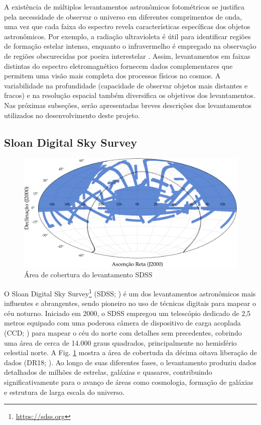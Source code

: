 A existência de múltiplos levantamentos astronômicos fotométricos se justifica pela necessidade de observar o universo em diferentes comprimentos de onda, uma vez que cada faixa do espectro revela características específicas dos objetos astronômicos. Por exemplo, a radiação ultravioleta é útil para identificar regiões de formação estelar intensa, enquanto o infravermelho é empregado na observação de regiões obscurecidas por poeira interestelar \cite[p. 28-31]{extragalactic-astronomy-book}. Assim, levantamentos em faixas distintas do espectro eletromagnético fornecem dados complementares que permitem uma visão mais completa dos processos físicos no cosmos. A variabilidade na profundidade (capacidade de observar objetos mais distantes e fracos) e na resolução espacial também diversifica os objetivos dos levantamentos. Nas próximas subseções, serão apresentadas breves descrições dos levantamentos utilizados no desenvolvimento deste projeto.


\subsection{Sloan Digital Sky Survey}
\label{sec:sdss}

\begin{figure}[!ht]
  \caption{Área de cobertura do levantamento SDSS}
  \label{fig:coverage-sdss}
  \includegraphics[width=\linewidth]{notebooks/plots/sdss_footprint.pdf}
\end{figure}

O Sloan Digital Sky Survey\footnote{\url{https://sdss.org}} (SDSS; \citealp{sdss}) é um dos levantamentos astronômicos mais influentes e abrangentes, sendo pioneiro no uso de técnicas digitais para mapear o céu noturno. Iniciado em 2000, o SDSS empregou um telescópio dedicado de 2,5 metros \cite{sdss-telescope} equipado com uma poderosa câmera de dispositivo de carga acoplada (CCD;  \citealp{sdss-camera}) para mapear o céu do norte com detalhes sem precedentes, cobrindo uma área de cerca de 14.000 graus quadrados, principalmente no hemisfério celestial norte. A Fig. \ref{fig:coverage-sdss} mostra a área de cobertuda da décima oitava liberação de dados (DR18; \citealp{sdss-dr18}). Ao longo de suas diferentes fases, o levantamento produziu dados detalhados de milhões de estrelas, galáxias e quasares, contribuindo significativamente para o avanço de áreas como cosmologia, formação de galáxias e estrutura de larga escala do universo.

